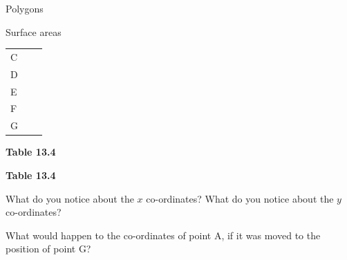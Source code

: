 \begin{exercises}{Polygons}
\begin{exercises}{Surface areas }
\begin{table}[H]
\begin{center}
\begin{xtabular}[t]{|l|l|l|}
    
        C &
    
    
         &
    
    
     \tabularnewline{}
    
    
        D &
    
    
         &
    
    
     \tabularnewline{}
    
    
        E &
    
    
         &
    
    
     \tabularnewline{}
    
    
        F &
    
    
         &
    
    
     \tabularnewline{}
    
    
        G &
    
    
         &
    
    
     \tabularnewline{}
    \end{xtabular}
      \end{center}
    \begin{center}{\small\bfseries Table 13.4}\end{center}
    \begin{caption}{\small\bfseries Table 13.4}\end{caption}
\end{table}
      
    \par
  
        
        \label{m39358*id70923}What do you notice about the $x$ co-ordinates? What do you notice about the $y$ co-ordinates?\par 
        \label{m39358*id70945}What would happen to the co-ordinates of point A, if it was moved to the position of point G?
 \par 


\end{exercises}
\end{exercises}
